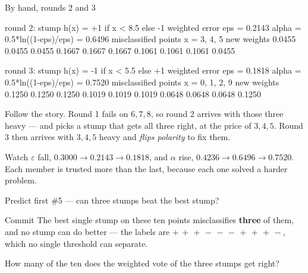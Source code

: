 \documentclass[aspectratio=169]{beamer}
\begin{document}
\begin{frame}[fragile,shrink=8]{By hand, rounds 2 and 3}
\begin{outblk}
round 2: stump  h(x) = +1 if x < 8.5 else -1
   weighted error  eps = 0.2143
   alpha = 0.5*ln((1-eps)/eps) = 0.6496
   misclassified points x = 3, 4, 5
   new weights 0.0455 0.0455 0.0455 0.1667 0.1667 0.1667 0.1061 0.1061 0.1061 0.0455

round 3: stump  h(x) = -1 if x < 5.5 else +1
   weighted error  eps = 0.1818
   alpha = 0.5*ln((1-eps)/eps) = 0.7520
   misclassified points x = 0, 1, 2, 9
   new weights 0.1250 0.1250 0.1250 0.1019 0.1019 0.1019 0.0648 0.0648 0.0648 0.1250
\end{outblk}
  \begin{center}\small
    Follow the story. Round 1 fails on $6,7,8$, so round 2 arrives with those
    three heavy --- and picks a stump that gets all three right, at the price
    of $3,4,5$. Round 3 then arrives with $3,4,5$ heavy and \emph{flips
    polarity} to fix them.
    \smallskip

    Watch $\varepsilon$ fall, $0.3000 \to 0.2143 \to 0.1818$, and $\alpha$
    rise, $0.4236 \to 0.6496 \to 0.7520$. Each member is trusted more than the
    last, because each one solved a harder problem.
  \end{center}
\end{frame}

\begin{frame}{Predict first \#5 --- can three stumps beat the best stump?}
  \begin{alertblock}{Commit}
    The best single stump on these ten points misclassifies \textbf{three} of
    them, and no stump can do better --- the labels are
    $+\,+\,+\,-\,-\,-\,+\,+\,+\,-$, which no single threshold can separate.

    \medskip
    \centering\large
    How many of the ten does the weighted vote of the three stumps get right?
  \end{alertblock}
\end{frame}
\end{document}
